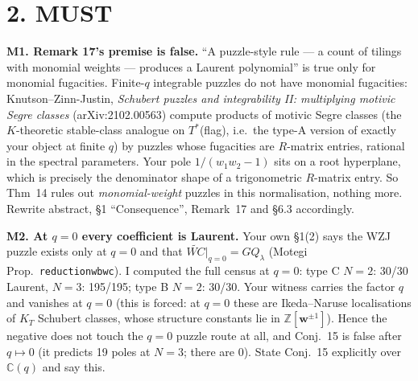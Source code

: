 \documentclass[11pt]{article}
\begin{document}
\section*{2. MUST}
\textbf{M1. Remark 17's premise is false.} ``A puzzle-style rule --- a count of tilings with monomial weights --- produces a Laurent
polynomial'' is true only for monomial fugacities. Finite-$q$ integrable puzzles do not have monomial fugacities: Knutson--Zinn-Justin,
\emph{Schubert puzzles and integrability II: multiplying motivic Segre classes} (arXiv:2102.00563) compute products of motivic
Segre classes (the $K$-theoretic stable-class analogue on $T^*$(flag), i.e.\ the type-A version of exactly your object at finite $q$)
by puzzles whose fugacities are $R$-matrix entries, rational in the spectral parameters. Your pole $1/(w_1w_2-1)$ sits on a root
hyperplane, which is precisely the denominator shape of a trigonometric $R$-matrix entry. So Thm~14 rules out \emph{monomial-weight}
puzzles in this normalisation, nothing more. Rewrite abstract, \S1 ``Consequence'', Remark~17 and \S6.3 accordingly.

\textbf{M2. At $q=0$ every coefficient is Laurent.} Your own \S1(2) says the WZJ puzzle exists only at $q=0$ and that
$\widetilde{WC}|_{q=0}=GQ_\lambda$ (Motegi Prop.~\texttt{reductionwbwc}). I computed the full census at $q=0$:
type C $N=2$: 30/30 Laurent, $N=3$: 195/195; type B $N=2$: 30/30. Your witness carries the factor $q$ and vanishes at $q=0$
(this is forced: at $q=0$ these are Ikeda--Naruse localisations of $K_T$ Schubert classes, whose structure constants lie in
$\mathbb Z[\mathbf w^{\pm1}]$). Hence the negative does not touch the $q=0$ puzzle route at all, and Conj.~15 is false after
$q\mapsto 0$ (it predicts 19 poles at $N=3$; there are 0). State Conj.~15 explicitly over $\mathbb C(q)$ and say this.
\end{document}
